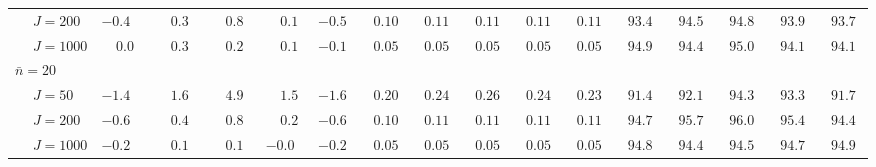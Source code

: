 \begin{sidewaystable}
\begin{threeparttable}
\begin{tabular}{llccccccccccccccc}
 & \nopagebreak $\;J=200$  & ${-}0.4\phantom{0}$ & $\phantom{-}0.3\phantom{0}$ & $\phantom{-}0.8\phantom{0}$ & $\phantom{-}0.1\phantom{0}$ & ${-}0.5\phantom{0}$ & $\phantom{0}0.10\phantom{0}$ & $\phantom{0}0.11\phantom{0}$ & $\phantom{0}0.11\phantom{0}$ & $\phantom{0}0.11\phantom{0}$ & $\phantom{0}0.11\phantom{0}$ & $\phantom{0}93.4\phantom{0}$ & $\phantom{0}94.5\phantom{0}$ & $\phantom{0}94.8\phantom{0}$ & $\phantom{0}93.9\phantom{0}$ & $\phantom{0}93.7\phantom{0}$ \\
 & \nopagebreak $\;J=1000$  & $\phantom{-}0.0\phantom{0}$ & $\phantom{-}0.3\phantom{0}$ & $\phantom{-}0.2\phantom{0}$ & $\phantom{-}0.1\phantom{0}$ & ${-}0.1\phantom{0}$ & $\phantom{0}0.05\phantom{0}$ & $\phantom{0}0.05\phantom{0}$ & $\phantom{0}0.05\phantom{0}$ & $\phantom{0}0.05\phantom{0}$ & $\phantom{0}0.05\phantom{0}$ & $\phantom{0}94.9\phantom{0}$ & $\phantom{0}94.4\phantom{0}$ & $\phantom{0}95.0\phantom{0}$ & $\phantom{0}94.1\phantom{0}$ & $\phantom{0}94.1\phantom{0}$ \\
\multicolumn{4}{l}{$\bar{n}=20$} \\  & \nopagebreak $\;J=50$  & ${-}1.4\phantom{0}$ & $\phantom{-}1.6\phantom{0}$ & $\phantom{-}4.9\phantom{0}$ & $\phantom{-}1.5\phantom{0}$ & ${-}1.6\phantom{0}$ & $\phantom{0}0.20\phantom{0}$ & $\phantom{0}0.24\phantom{0}$ & $\phantom{0}0.26\phantom{0}$ & $\phantom{0}0.24\phantom{0}$ & $\phantom{0}0.23\phantom{0}$ & $\phantom{0}91.4\phantom{0}$ & $\phantom{0}92.1\phantom{0}$ & $\phantom{0}94.3\phantom{0}$ & $\phantom{0}93.3\phantom{0}$ & $\phantom{0}91.7\phantom{0}$ \\
 & \nopagebreak $\;J=200$  & ${-}0.6\phantom{0}$ & $\phantom{-}0.4\phantom{0}$ & $\phantom{-}0.8\phantom{0}$ & $\phantom{-}0.2\phantom{0}$ & ${-}0.6\phantom{0}$ & $\phantom{0}0.10\phantom{0}$ & $\phantom{0}0.11\phantom{0}$ & $\phantom{0}0.11\phantom{0}$ & $\phantom{0}0.11\phantom{0}$ & $\phantom{0}0.11\phantom{0}$ & $\phantom{0}94.7\phantom{0}$ & $\phantom{0}95.7\phantom{0}$ & $\phantom{0}96.0\phantom{0}$ & $\phantom{0}95.4\phantom{0}$ & $\phantom{0}94.4\phantom{0}$ \\
 & \nopagebreak $\;J=1000$  & ${-}0.2\phantom{0}$ & $\phantom{-}0.1\phantom{0}$ & $\phantom{-}0.1\phantom{0}$ & ${-}0.0\phantom{0}$ & ${-}0.2\phantom{0}$ & $\phantom{0}0.05\phantom{0}$ & $\phantom{0}0.05\phantom{0}$ & $\phantom{0}0.05\phantom{0}$ & $\phantom{0}0.05\phantom{0}$ & $\phantom{0}0.05\phantom{0}$ & $\phantom{0}94.8\phantom{0}$ & $\phantom{0}94.4\phantom{0}$ & $\phantom{0}94.5\phantom{0}$ & $\phantom{0}94.7\phantom{0}$ & $\phantom{0}94.9\phantom{0}$ \\

\end{tabular}
\end{threeparttable}
\end{sidewaystable}
